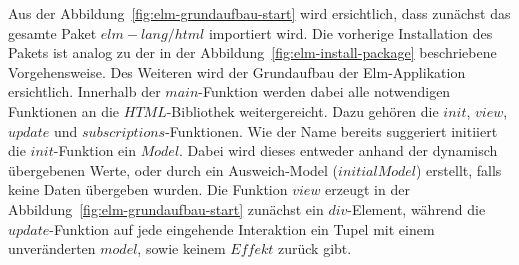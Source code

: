 Aus der Abbildung~\ref{fig:elm-grundaufbau-start} wird ersichtlich, dass zunächst das gesamte Paket $elm-lang/html$ importiert wird. Die vorherige Installation des Pakets ist analog zu der in der Abbildung~\ref{fig:elm-install-package} beschriebene Vorgehensweise. Des Weiteren wird der Grundaufbau der Elm-Applikation ersichtlich.
Innerhalb der $main$-Funktion werden dabei alle notwendigen Funktionen an die $HTML$-Bibliothek weitergereicht. Dazu gehören die $init$, $view$, $update$ und $subscriptions$-Funktionen. Wie der Name bereits suggeriert initiiert die $init$-Funktion ein $Model$. Dabei wird dieses entweder anhand der dynamisch übergebenen Werte, oder durch ein Ausweich-Model ($initialModel$) erstellt, falls keine Daten übergeben wurden.
Die Funktion $view$ erzeugt in der Abbildung~\ref{fig:elm-grundaufbau-start} zunächst ein $div$-Element, während die $update$-Funktion auf jede eingehende Interaktion ein Tupel mit einem unveränderten $model$, sowie keinem $Effekt$ zurück gibt.























\iffalse

